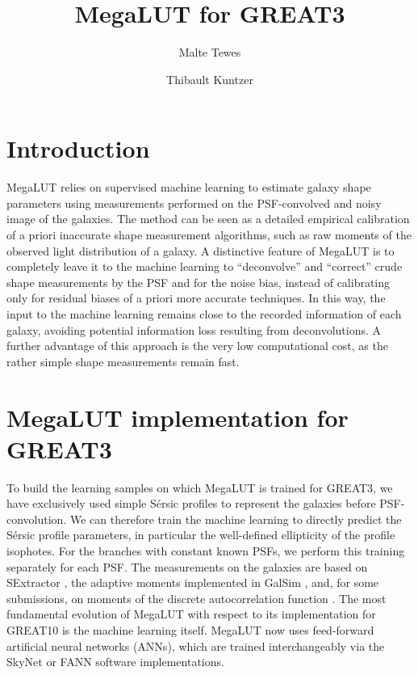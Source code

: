 \documentclass[a4paper,11pt]{scrartcl}
\title{MegaLUT for GREAT3}
\author{Malte Tewes \\\mail{mtewes@astro.uni-bonn.de}\and Thibault Kuntzer\\\mail{thibault.kuntzer@epfl.ch}}
\begin{document}
\maketitle


\section{Introduction}

MegaLUT relies on supervised machine learning to estimate galaxy shape parameters using measurements performed on the PSF-convolved and noisy image of the galaxies. The method can be seen as a detailed empirical calibration of a priori inaccurate shape measurement algorithms, such as raw moments of the observed light distribution of a galaxy. A distinctive feature of MegaLUT is to completely leave it to the machine learning to ``deconvolve'' and ``correct'' crude shape measurements by the PSF and for the noise bias, instead of calibrating only for residual biases of a priori more accurate techniques. In this way, the input to the machine learning remains close to the recorded information of each galaxy, avoiding potential information loss resulting from deconvolutions. A further advantage of this approach is the very low computational cost, as the rather simple shape measurements remain fast.

\section{MegaLUT implementation for GREAT3}

To build the learning samples on which MegaLUT is trained for GREAT3, we have exclusively used simple S\'ersic profiles to represent the galaxies before PSF-convolution. We can therefore train the machine learning to directly predict the S\'ersic profile parameters, in particular the well-defined ellipticity of the profile isophotes. For the branches with constant known PSFs, we perform this training separately for each PSF. The measurements on the galaxies are based on SExtractor \citep{sextractor}, the adaptive moments implemented in GalSim \citep{galsim, Hirata:2003ji}, and, for some submissions, on moments of the discrete autocorrelation function \citep[ACF, ][]{Waerbeke97}. The most fundamental evolution of MegaLUT with respect to its implementation for GREAT10 \citep[described in][]{Tewes:2012gy} is the machine learning itself. MegaLUT now uses feed-forward artificial neural networks (ANNs), which are trained interchangeably via the SkyNet \citep{skynet} or FANN \citep{nissen03} software implementations.
\end{document}
